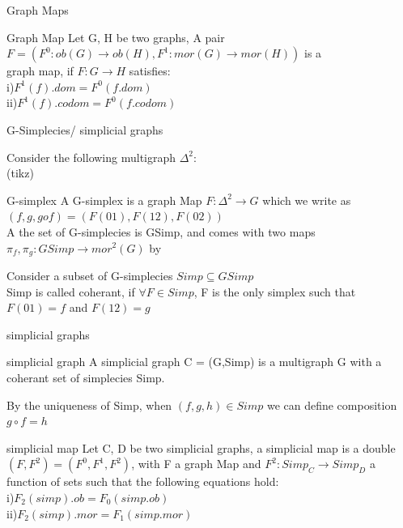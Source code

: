 \documentclass[11pt]{beamer}
\begin{document}
\begin{frame}{Graph Maps}
\begin{block}{Graph Map}
Let G, H be two graphs, A pair $F = (F^0:ob(G) \to ob(H),F^1:mor(G) \to mor(H))$ is a \\graph map, if $F:G \to H$ satisfies:\\
i)$F^1(f).dom = F^0(f.dom)$\\
ii)$F^1(f).codom = F^0(f.codom)$

\end{block}
\end{frame}

\begin{frame}{G-Simplecies/ simplicial graphs}

Consider the following multigraph  $\Delta^2$:\\
(tikz)\\
\begin{block}{G-simplex}
A G-simplex is a graph Map $F:\Delta^2 \to G$ which we write as $(f,g,gof) = (F(01),F(12),F(02))$\\
A the set of G-simplecies is GSimp, and comes with two maps$\pi_f,\pi_g:GSimp \to mor^2(G)$ by \\ 
\end{block}
Consider a subset of G-simplecies $Simp \subseteq GSimp$\\
Simp is called coherant, if $\forall F \in Simp$, F is the only simplex such that $F(01) = f$ and $F(12) = g$
\\

\end{frame}


\begin{frame}{simplicial graphs}
\begin{block}{simplicial graph}
A simplicial graph C = (G,Simp) is a multigraph G with a coherant set of simplecies Simp.\\
\end{block}
By the uniqueness of Simp, when $(f,g,h)\in Simp$ we can define composition $g\circ f = h$

    \begin{block}{simplicial map}
        Let C, D be two simplicial graphs, a simplicial map is a double $(F,F^2) = (F^0,F^1,F^2)$, with F a graph Map and $F^2:Simp_C \to Simp_D$ a function of sets such that the following equations hold:\\
        i)$F_2(simp).ob = F_0(simp.ob)$\\
        ii)$F_2(simp).mor = F_1(simp.mor)$
    \end{block}
\end{frame}
\end{document}
